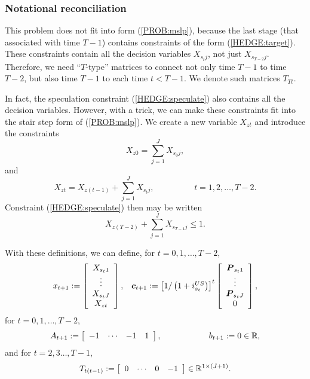 \subsubsection{Notational reconciliation}

This problem does not fit into form (\ref{PROB:mslp}), because the last stage (that associated with time $T-1$) contains constraints of the form (\ref{HEDGE:target}).  These constraints contain all the decision variables $X_{s_t j}$, not just $X_{s_{T-2} j}$.  Therefore, we need ``$T$-type'' matrices to connect not only time $T-1$ to time $T-2$, but also time $T-1$ to each time $t<T-1$.  We denote such matrices $T_{Tt}$.

In fact, the speculation constraint (\ref{HEDGE:speculate}) also contains all the decision variables.  However, with a trick, we can make these constraints fit into the stair step form of (\ref{PROB:mslp}).  We create a new variable $X_{zt}$ and introduce the constraints
\[
X_{z0} = \sum_{j=1}^J X_{s_0 j},
\]
and
\[
X_{zt} = X_{z(t-1)} + \sum_{j=1}^J X_{s_t j}, \hspace{2cm} t=1, 2, \ldots, T-2.
\]
Constraint (\ref{HEDGE:speculate}) then may be written
\begin{equation}
\label{PROB:speculatetricky}
X_{z(T-2)} + \sum_{j=1}^J X_{s_{T-1} j} \leq 1.
\end{equation}

With these definitions, we can define, for $t=0, 1, \ldots, T-2$,
\[
\begin{array}{cc}
x_{t+1} := \left[\begin{array}{c} X_{s_t 1}\\ \vdots \\ X_{s_t J}\\ X_{zt}\end{array}\right], & \mathbf{\boldsymbol{c}}_{t+1} := \left[1/\left(1+i_{s_t}^{US}\right)\right]^t\left[\begin{array}{c}\mathbf{\boldsymbol{P}}_{s_t 1}\\ \vdots \\ \mathbf{\boldsymbol{P}}_{s_t J}\\ 0\end{array}\right],\end{array}
\]
for $t=0, 1, \ldots, T-2$,
\[
A_{t+1}:= \left[\begin{array}{cccc} -1 & \cdots & -1 & 1\end{array}\right], \hspace{2cm} b_{t+1}:= 0 \in {\mathbb R},
\]
and for $t= 2,3 \ldots, T-1$, 
\[
T_{t(t-1)} := \left[\begin{array}{cccc} 0 & \cdots & 0 & -1\end{array}\right] \in {\mathbb R}^{1\times (J+1)}.
\]

